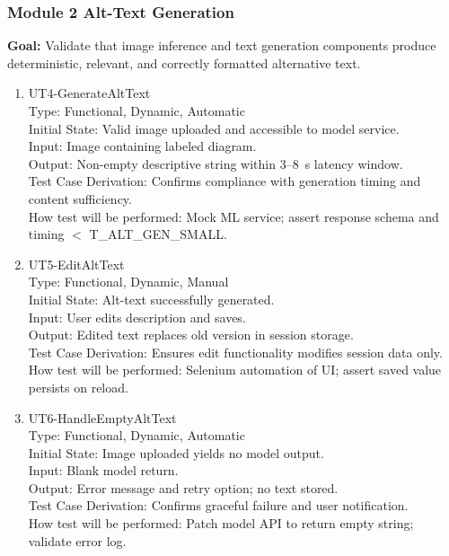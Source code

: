 \documentclass[12pt, titlepage]{article}
\begin{document}
\subsubsection{Module 2 \textemdash{} Alt-Text Generation}

\textbf{Goal:} Validate that image inference and text generation
components produce deterministic, relevant, and correctly formatted
alternative text.

\begin{enumerate}
  \item{UT4-GenerateAltText\\}
    Type: Functional, Dynamic, Automatic\\
    Initial State: Valid image uploaded and accessible to model service.\\
    Input: Image containing labeled diagram.\\
    Output: Non-empty descriptive string within 3--8~s latency window.\\
    Test Case Derivation: Confirms compliance with generation timing
    and content sufficiency.\\
    How test will be performed: Mock ML service; assert response schema
    and timing $<$ T\_ALT\_GEN\_SMALL.

  \item{UT5-EditAltText\\}
    Type: Functional, Dynamic, Manual\\
    Initial State: Alt-text successfully generated.\\
    Input: User edits description and saves.\\
    Output: Edited text replaces old version in session storage.\\
    Test Case Derivation: Ensures edit functionality modifies session
    data only.\\
    How test will be performed: Selenium automation of UI; assert saved
    value persists on reload.

  \item{UT6-HandleEmptyAltText\\}
    Type: Functional, Dynamic, Automatic\\
    Initial State: Image uploaded yields no model output.\\
    Input: Blank model return.\\
    Output: Error message and retry option; no text stored.\\
    Test Case Derivation: Confirms graceful failure and user notification.\\
    How test will be performed: Patch model API to return empty string;
    validate error log.
\end{enumerate}
\end{document}
